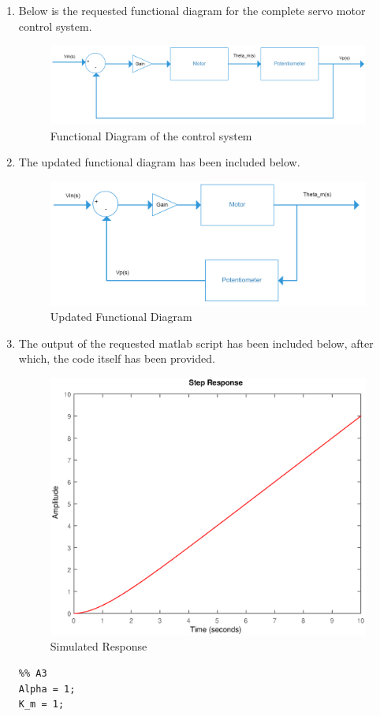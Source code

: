 \documentclass[11pt,a4paper]{article}
\begin{document}
\begin{enumerate}
	\item Below is the requested functional diagram for the complete servo motor control system.    
    \begin{figure}[H]
	\centering
	\includegraphics[width=.8\textwidth]{PreLach/A2a.png}
	\caption{\label{fig:funcagram}Functional Diagram of the control system}
	\end{figure}
    
    
	\item The updated functional diagram has been included below.
    \begin{figure}[H]
	\centering
	\includegraphics[width=.8\textwidth]{PreLach/A2b.png}
	\caption{\label{fig:updatedfuncagram}Updated Functional Diagram}
	\end{figure}
    
    
    
    
    \pagebreak
	\item The output of the requested matlab script has been included below, after which, the code itself has been provided. 
    \begin{figure}[H]
	\centering
	\includegraphics[width=.8\textwidth]{PreLach/a3.eps}
	\caption{\label{fig:simrep} Simulated Response}
	\end{figure}
    \begin{lstlisting}
%% A3
Alpha = 1;
K_m = 1;


\end{lstlisting}
\end{enumerate}
\end{document}
